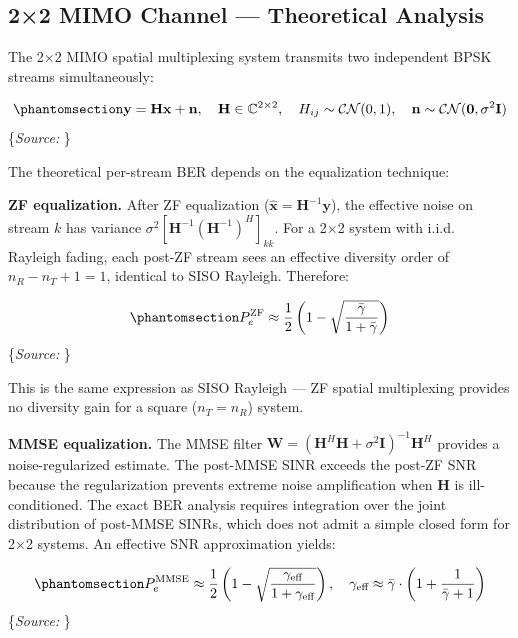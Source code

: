 \documentclass[
  english,
  12pt,
  12pt,
  a4paper,
  oneside]{report}
\begin{document}
\subsection{2×2 MIMO Channel --- Theoretical Analysis}\label{sec:mimo-channel-theoretical-analysis}

The 2×2 MIMO spatial multiplexing system transmits two independent BPSK streams simultaneously:

\begin{equation}\protect\phantomsection\label{eq:mimo-received-2x2}{\mathbf{y} = \mathbf{H}\mathbf{x} + \mathbf{n}, \quad \mathbf{H} \in \mathbb{C}^{2 \times 2}, \quad H_{ij} \sim \mathcal{CN}(0, 1), \quad \mathbf{n} \sim \mathcal{CN}(\mathbf{0}, \sigma^2\mathbf{I})
}\end{equation} \footnotesize\{\textit{Source: \1}\}\normalsize

The theoretical per-stream BER depends on the equalization technique:

\textbf{ZF equalization.} After ZF equalization (\(\hat{\mathbf{x}} = \mathbf{H}^{-1}\mathbf{y}\)), the effective noise on stream \(k\) has variance \(\sigma^2 [\mathbf{H}^{-1}(\mathbf{H}^{-1})^H]_{kk}\). For a 2×2 system with i.i.d. Rayleigh fading, each post-ZF stream sees an effective diversity order of \(n_R - n_T + 1 = 1\), identical to SISO Rayleigh. Therefore:

\begin{equation}\protect\phantomsection\label{eq:zf-ber-mimo}{P_e^{\text{ZF}} \approx \frac{1}{2}\left(1 - \sqrt{\frac{\bar{\gamma}}{1 + \bar{\gamma}}}\right)
}\end{equation} \footnotesize\{\textit{Source: \1}\}\normalsize

This is the same expression as SISO Rayleigh --- ZF spatial multiplexing provides no diversity gain for a square (\(n_T = n_R\)) system.

\textbf{MMSE equalization.} The MMSE filter \(\mathbf{W} = (\mathbf{H}^H\mathbf{H} + \sigma^2\mathbf{I})^{-1}\mathbf{H}^H\) provides a noise-regularized estimate. The post-MMSE SINR exceeds the post-ZF SNR because the regularization prevents extreme noise amplification when \(\mathbf{H}\) is ill-conditioned. The exact BER analysis requires integration over the joint distribution of post-MMSE SINRs, which does not admit a simple closed form for 2×2 systems. An effective SNR approximation yields:

\begin{equation}\protect\phantomsection\label{eq:mmse-ber-mimo}{P_e^{\text{MMSE}} \approx \frac{1}{2}\left(1 - \sqrt{\frac{\gamma_{\text{eff}}}{1 + \gamma_{\text{eff}}}}\right), \quad \gamma_{\text{eff}} \approx \bar{\gamma} \cdot \left(1 + \frac{1}{\bar{\gamma} + 1}\right)
}\end{equation} \footnotesize\{\textit{Source: \1}\}\normalsize
\end{document}
